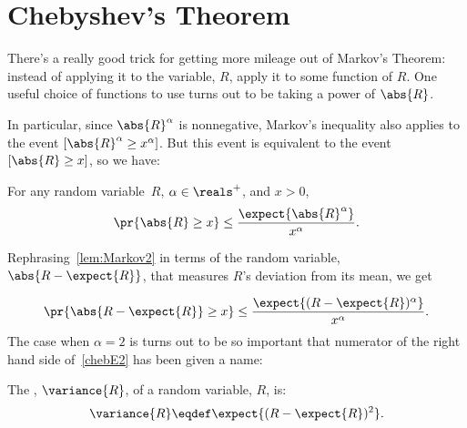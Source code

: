 \begin{problems}

\classproblems
{}

\end{problems}

\section{Chebyshev's Theorem}

There's a really good trick for getting more mileage out of Markov's
Theorem: instead of applying it to the variable, $R$, apply it to some
function of $R$.  One useful choice of functions to use turns out to be
taking a power of $\abs{R}$.

In particular, since $\abs{R}^\alpha$ is nonnegative, Markov's inequality
also applies to the event $[\abs{R}^\alpha \geq x^\alpha]$.  But this
event is equivalent to the event $[\abs{R} \geq x]$, so we have:

\iffalse
It is a bit messy to apply Markov's Theorem directly to this problem,
because it's generally not easy to compute $\expect{\ \abs{R -
\expect{R}}\ }$.  However, since $\abs{R}$ and hence $\abs{R}^k$ are
nonnegative variables for any $R$, Markov's inequality also applies to the
event $[\abs{R}^k \geq x^k]$.  But this event is equivalent to the event
$[\abs{R} \geq x]$, so we have:
\fi

\begin{lemma}\label{lem:Markov2}
For any random variable~$R$, $\alpha \in \reals^+$, and $x > 0$,
\[
\pr{\abs{R} \geq x} \leq \frac{\expect{\abs{R}^\alpha}}{x^\alpha}.
\]
\end{lemma}
Rephrasing~\eqref{lem:Markov2} in terms of the random variable, $\abs{R -
  \expect{R}}$, that measures $R$'s deviation from its mean, we get

\begin{equation}\label{chebE2}
  \pr{\abs{R - \expect{R}} \geq x} \leq \frac{\expect{(R - \expect{R})^\alpha}}{x^\alpha}.
\end{equation}
The case when $\alpha =2$ is turns out to be so important that numerator
of the right hand side of~\eqref{chebE2} has been given a name:

\begin{definition}\label{defvar}
The , $\variance{R}$, of a random variable, $R$, is:
\[
\variance{R} \eqdef \expect{(R - \expect{R})^2}.
\]
\end{definition}

